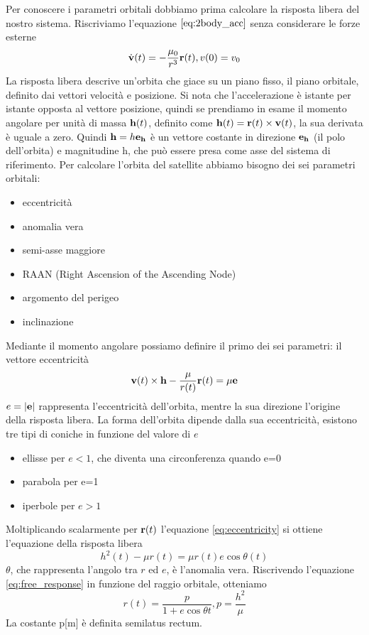 Per conoscere i parametri orbitali dobbiamo prima calcolare la risposta libera
del nostro sistema. Riscriviamo l'equazione $\ref{eq:2body_acc}$ senza
considerare le forze esterne
\begin{equation}
\dot{\bf v}(t)=-\frac{\mu_0}{r^3}{\bf r}(t), v(0)=v_0
\end{equation}
La risposta libera descrive un'orbita che giace su un piano fisso, il piano
orbitale, definito dai vettori velocità e posizione. Si nota che l'accelerazione
è istante per istante opposta al vettore posizione, quindi se prendiamo in esame
il momento angolare per unità di massa ${\bf h}(t)$, definito come ${\bf
h}(t)={\bf r}(t)\times {\bf v}(t)$, la sua derivata è uguale a zero. Quindi
${\bf h}=h{\bf e_h}$ è un vettore costante in direzione ${\bf e_h}$ (il polo dell'orbita) e
magnitudine h, che può essere presa come asse del sistema di riferimento.
Per calcolare l'orbita del satellite abbiamo bisogno dei sei parametri orbitali:
\begin{itemize}
  \item eccentricità
  \item anomalia vera
  \item semi-asse maggiore
  \item RAAN (Right Ascension of the Ascending Node)
  \item argomento del perigeo
  \item inclinazione
\end{itemize}
Mediante il momento angolare possiamo definire il primo dei sei
parametri: il vettore eccentricità
\begin{equation}
{\bf v}(t) \times {\bf h} - \frac{\mu}{r(t)}{\bf r}(t)=\mu{\bf e}
\label{eq:eccentricity}
\end{equation}
$e=|{\bf e}|$ rappresenta  l'eccentricità dell'orbita, mentre la sua direzione
l'origine della risposta libera. La forma dell'orbita dipende dalla sua
eccentricità, esistono tre tipi di coniche in funzione del valore di $e$
\begin{itemize}
  \item ellisse per $e<1$, che diventa una circonferenza quando e=0
  \item parabola per e=1 
  \item iperbole per $e>1$
\end{itemize}
Moltiplicando scalarmente per ${\bf r}(t)$ l'equazione \ref{eq:eccentricity} si
ottiene l'equazione della risposta libera
\begin{equation}
h^2(t)-\mu r(t)=\mu r(t)e \cos{\theta(t)}
\label{eq:free_response}
\end{equation}
$\theta$, che rappresenta l'angolo tra $r$ ed $e$, è l'anomalia vera.
Riscrivendo l'equazione \ref{eq:free_response} in funzione del raggio orbitale,
otteniamo
\begin{equation}
r(t)=\frac{p}{1+e\cos{\theta{t}}} , p=\frac{h^2}{\mu}
\end{equation}
La costante p[m] è definita semilatus rectum.


